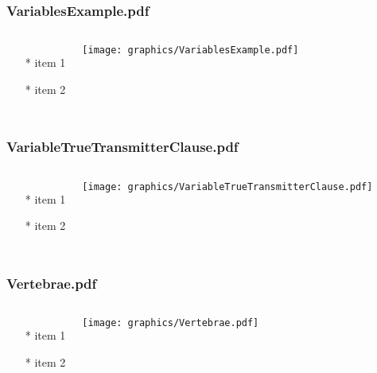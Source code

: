 \documentclass{beamer}
\begin{document}
\begin{frame} \frametitle{VariablesExample.pdf}
    \begin{columns}[c]
        \begin{itemize}
            \item[*] item 1
            \item[*] item 2
        \end{itemize}
        \begin{minipage}{\linewidth}
            \begin{center}
            \texttt{[image: graphics/VariablesExample.pdf]}
            \label{gfx:VariablesExample.pdf}
            \end{center}
        \end{minipage}
    \end{columns}
\end{frame}
\begin{frame} \frametitle{VariableTrueTransmitterClause.pdf}
    \begin{columns}[c]
        \begin{itemize}
            \item[*] item 1
            \item[*] item 2
        \end{itemize}
        \begin{minipage}{\linewidth}
            \begin{center}
            \texttt{[image: graphics/VariableTrueTransmitterClause.pdf]}
            \label{gfx:VariableTrueTransmitterClause.pdf}
            \end{center}
        \end{minipage}
    \end{columns}
\end{frame}
\begin{frame} \frametitle{Vertebrae.pdf}
    \begin{columns}[c]
        \begin{itemize}
            \item[*] item 1
            \item[*] item 2
        \end{itemize}
        \begin{minipage}{\linewidth}
            \begin{center}
            \texttt{[image: graphics/Vertebrae.pdf]}
            \label{gfx:Vertebrae.pdf}
            \end{center}
        \end{minipage}
    \end{columns}
\end{frame}
\end{document}
